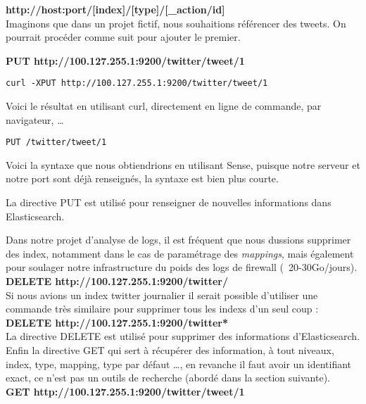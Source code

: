\textbf{{\color{grey}http://host:port}/[{\color{red}index}]/[{\color{cyan}type}]/[{\color{yellow}\_action/id}]}\\[5mm]
Imaginons que dans un projet fictif, nous souhaitions référencer des tweets.
On pourrait procéder comme suit pour ajouter le premier.

\textbf{PUT  {\color{grey} http://100.127.255.1:9200}/{\color{red}twitter}/{\color{cyan}tweet}/{\color{yellow}1}}

\begin{lstlisting}[style=code,label={lst:RESTexemple1curl},caption={Avec curl}]
curl -XPUT http://100.127.255.1:9200/twitter/tweet/1
\end{lstlisting}
Voici le résultat en utilisant curl, directement en ligne de commande, par 
navigateur, \ldots

\begin{lstlisting}[style=code,label={lst:RESTexemple1sense},caption={Avec Sense}]
PUT /twitter/tweet/1
\end{lstlisting}

Voici la syntaxe que nous obtiendrions en utilisant Sense, puisque notre serveur 
et notre port sont déjà renseignés, la syntaxe est bien plus courte.

La directive PUT est utilisé pour renseigner de nouvelles informations dans Elasticsearch.


Dans notre projet d'analyse de logs, il est fréquent que nous dussions supprimer 
des index, notamment dans le cas de paramétrage des \emph{mappings}, mais également
pour soulager notre infrastructure du poids des logs de firewall (~20-30Go/jours).\\

\textbf{DELETE  {\color{grey} http://100.127.255.1:9200}/{\color{red}twitter}/}\\

Si nous avions un index twitter journalier il serait possible d'utiliser une commande
très similaire pour supprimer tous les indexs d'un seul coup :\\

\textbf{DELETE  {\color{grey} http://100.127.255.1:9200}/{\color{red}twitter*}}\\

La directive DELETE est utilisé pour supprimer des informations d'Elasticsearch.\\


Enfin la directive GET qui sert à récupérer des information, à tout niveaux, index,
type, mapping, type par défaut \ldots, en revanche il faut avoir un identifiant exact,
ce n'est pas un outils de recherche (abordé dans la section suivante).\\[5mm]
\textbf{GET  {\color{grey} http://100.127.255.1:9200}/{\color{red}twitter}/{\color{cyan}tweet}/{\color{yellow}1}}\\

